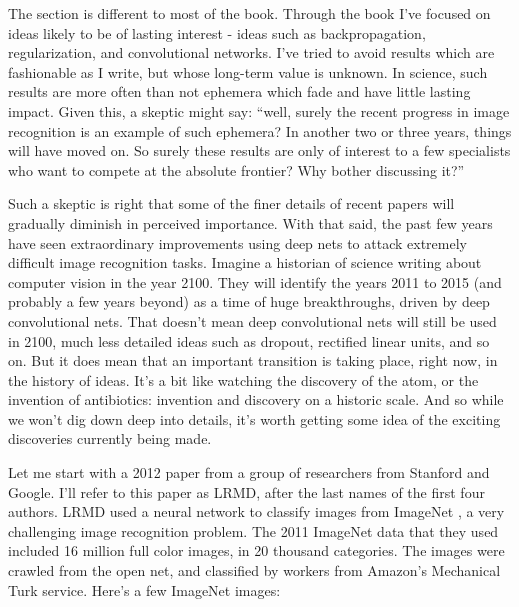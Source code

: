 The section is different to most of the book. Through the book I've focused on ideas likely to be of lasting interest - ideas such as backpropagation, regularization, and convolutional networks. I've tried to avoid results which are fashionable as I write, but whose long-term value is unknown. In science, such results are more often than not ephemera which fade and have little lasting impact. Given this, a skeptic might say: ``well, surely the recent progress in image recognition is an example of such ephemera? In another two or three years, things will have moved on. So surely these results are only of interest to a few specialists who want to compete at the absolute frontier? Why bother discussing it?''

Such a skeptic is right that some of the finer details of recent papers will gradually diminish in perceived importance. With that said, the past few years have seen extraordinary improvements using deep nets to attack extremely difficult image recognition tasks. Imagine a historian of science writing about computer vision in the year 2100. They will identify the years 2011 to 2015 (and probably a few years beyond) as a time of huge breakthroughs, driven by deep convolutional nets. That doesn't mean deep convolutional nets will still be used in 2100, much less detailed ideas such as dropout, rectified linear units, and so on. But it does mean that an important transition is taking place, right now, in the history of ideas. It's a bit like watching the discovery of the atom, or the invention of antibiotics: invention and discovery on a historic scale. And so while we won't dig down deep into details, it's worth getting some idea of the exciting discoveries currently being made.



 Let me start with a 2012 paper \cite{DBLP:journals/corr/abs-1112-6209} from a group of researchers from Stanford and Google. I'll refer to this paper as LRMD, after the last names of the first four authors. LRMD used a neural network to classify images from ImageNet \cite{imagenetorg2019}, a very challenging image recognition problem. The 2011 ImageNet data that they used included 16 million full color images, in 20 thousand categories. The images were crawled from the open net, and classified by workers from Amazon's Mechanical Turk service. Here's a few ImageNet images:

